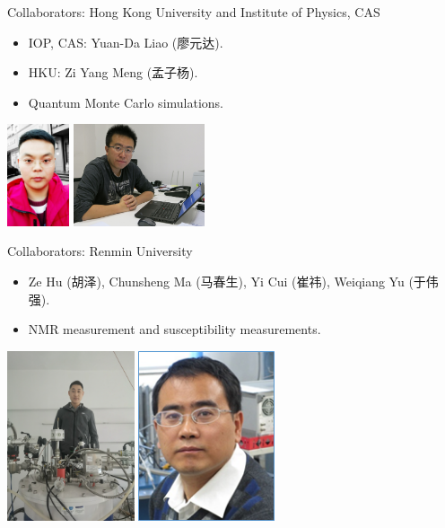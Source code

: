 \documentclass[xcolor=table, aspectratio=169,ignorenonframetext]{beamer}
\begin{document}
\begin{frame}{Collaborators: Hong Kong University and Institute of Physics, CAS}
\begin{itemize}
	\item IOP, CAS: Yuan-Da Liao (廖元达).
	\item HKU: Zi Yang Meng (孟子杨).
	\item Quantum Monte Carlo simulations.
\end{itemize}
	\begin{center}
		\includegraphics[height=3cm]{../people/yuandaliao}
		\includegraphics[height=3cm]{../people/ziyangmeng}
	\end{center}
\end{frame}

\begin{frame}{Collaborators: Renmin University}
\begin{itemize}
	\item Ze Hu (胡泽), Chunsheng Ma (马春生), Yi Cui (崔祎), Weiqiang Yu (于伟强).
	\item NMR measurement and susceptibility measurements.
\end{itemize}
	\begin{center}
		\includegraphics[height=5cm]{../people/zehu_large}
		\includegraphics[height=5cm]{../people/weiqiangyu}
	\end{center}
\end{frame}
\end{document}
